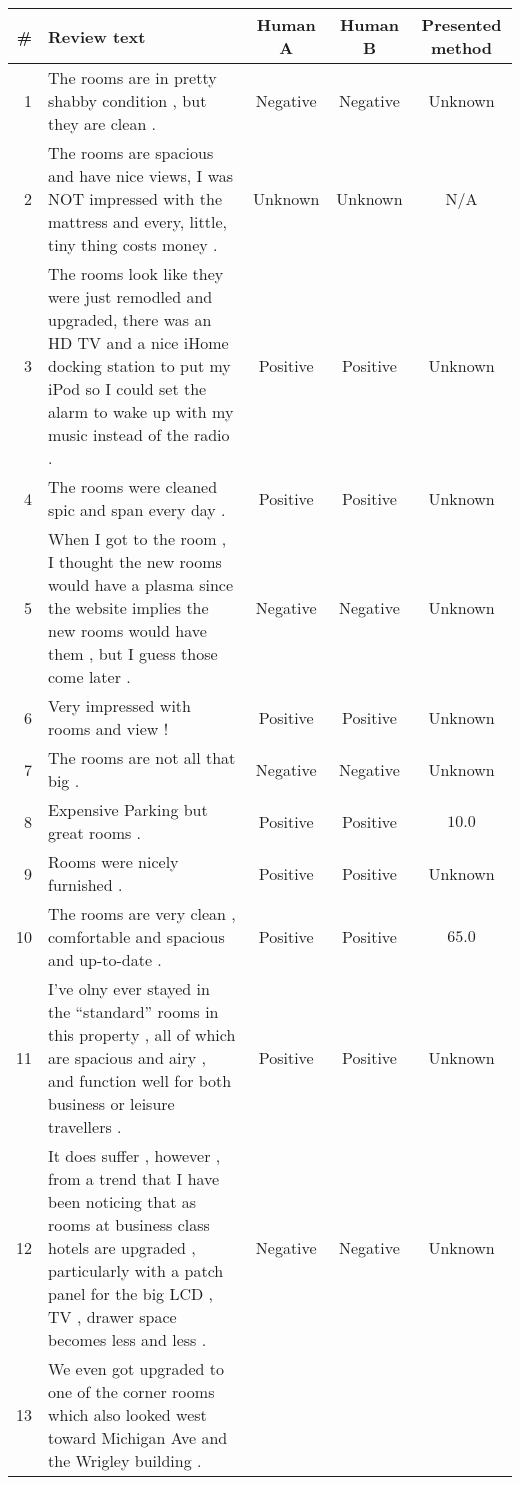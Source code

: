 \begin{landscape}
\begin{center}
\small %
\begin{longtable}{rm{9cm}ccc}
\# & Review text & Human A & Human B & Presented method \\
\hline\hline
\endhead
1 & The rooms are in pretty shabby condition , but they are clean . 
& Negative & Negative & Unknown \\ \hline
2 & The rooms are spacious and have nice views, I was NOT impressed with the mattress and every, little, tiny thing costs money . 
& Unknown & Unknown & N/A \\ \hline
3 & The rooms look like they were just remodled and upgraded, there was an HD TV and a nice iHome docking station to put my iPod so I could set the alarm to wake up with my music instead of the radio .
& Positive & Positive & Unknown \\ \hline
4 & The rooms were cleaned spic and span every day .
& Positive & Positive & Unknown \\ \hline
5 & When I got to the room , I thought the new rooms would have a plasma since the website implies the new rooms would have them , but I guess those come later .
& Negative & Negative & Unknown \\ \hline
6 & Very impressed with rooms and view !
& Positive & Positive & Unknown \\ \hline
7 & The rooms are not all that big .
& Negative & Negative & Unknown \\ \hline
8 & Expensive Parking but great rooms .
& Positive & Positive & $10.0$ \\ \hline
9 & Rooms were nicely furnished .
& Positive & Positive & Unknown \\ \hline
10 & The rooms are very clean , comfortable and spacious and up-to-date .
& Positive & Positive & $65.0$ \\ \hline
11 & I've olny ever stayed in the ``standard'' rooms in this property , all of which are spacious and airy , and function well for both business or leisure travellers .
& Positive & Positive & Unknown \\ \hline
12 & It does suffer , however , from a trend that I have been noticing that as rooms at business class hotels are upgraded ,  particularly with a patch panel for the big LCD , TV , drawer space becomes less and less .
& Negative & Negative & Unknown \\ \hline
13 & We even got upgraded to one of the corner rooms which also looked west toward Michigan Ave and the Wrigley building .

\end{longtable}
\end{center}
\end{landscape}
